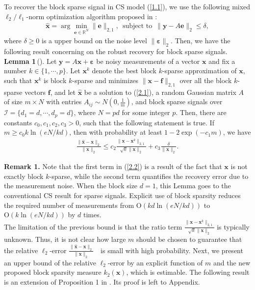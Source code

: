 \documentclass[journal,onecolumn]{IEEEtran}
\begin{document}
To recover the block sparse signal in CS model (\ref{1.1}), we use the following mixed $\ell_2/\ell_1$-norm optimization algorithm proposed in \cite{ekb,em}: \begin{align}
\widehat{\mathbf{x}}=\arg\min_{\mathbf{e}\in\mathbb{R}^N}\lVert\mathbf{e}\rVert_{2,1},\,\,\,\text{subject to}\,\,\,\lVert\mathbf{y}-A\mathbf{e}\rVert_2\leq\delta,
\label{2.1}
\end{align}
where $\delta\geq 0$ is a upper bound on the noise level $\lVert\boldsymbol{\varepsilon}\rVert_2$. Then, we have the following result concerning on the robust recovery for block sparse signals.\\

\noindent
{\bf Lemma 1}\,(\cite{em}). Let $\mathbf{y}=A\mathbf{x}+\boldsymbol{\varepsilon}$ be noisy measurements of a vector $\mathbf{x}$ and fix a number $k\in\{1,\cdots,p\}$. Let $\mathbf{x}^k$ denote the best block $k$-sparse approximation of $\mathbf{x}$, such that $\mathbf{x}^k$ is block $k$-sparse and minimizes $\lVert\mathbf{x}-\mathbf{f}\rVert_{2,1}$ over all the block $k$-sparse vectors $\mathbf{f}$, and let $\widehat{\mathbf{x}}$ be a solution to (\ref{2.1}), a random Gaussian matrix $A$ of size $m\times N$ with entries $A_{ij}\sim N(0,\frac{1}{m})$, and block sparse signals over $\mathcal{I}=\{d_1=d,\cdots,d_p=d\}$, where $N=pd$ for some integer $p$. Then, there are constants $c_0,c_1,c_2,c_3>0$, such that the following statement is true. If $m\geq c_0 k\ln(eN/kd)$, then with probability at least $1-2\exp(-c_1 m)$,  we have\begin{align}
\frac{\lVert\widehat{\mathbf{x}}-\mathbf{x}\rVert_2}{\lVert\mathbf{x}\rVert_2}\leq c_2\frac{\lVert\mathbf{x}-\mathbf{x}^k\rVert_{2,1}}{\sqrt{k}\lVert\mathbf{x}\rVert_2}+c_3\frac{\delta}{\lVert\mathbf{x}\rVert_2}.\label{2.2}
\end{align}

\noindent
{\bf Remark 1.} Note that the first term in (\ref{2.2}) is a result of the fact that $\mathbf{x}$ is not exactly block $k$-sparse, while the second term quantifies the recovery error due to the measurement noise. When the block size $d=1$, this Lemma goes to the conventional CS result for sparse signals. Explicit use of block sparsity reduces the required number of measurements from $\mathrm{O}(kd\ln(eN/kd))$ to $\mathrm{O}(k\ln(eN/kd))$ by $d$ times.\\

The limitation of the previous bound is that the ratio term $\frac{\lVert\mathbf{x}-\mathbf{x}^k\rVert_{2,1}}{\sqrt{k}\lVert\mathbf{x}\rVert_2}$ is typically unknown. Thus, it is not clear how large $m$ should be chosen to guarantee that the relative $\ell_2$-error $\frac{\lVert\widehat{\mathbf{x}}-\mathbf{x}\rVert_2}{\lVert\mathbf{x}\rVert_2}$　is small with high probability. Next, we present an upper bound of the relative $\ell_2$-error by an explicit function of $m$ and the new proposed block sparsity measure $k_2(\mathbf{x})$, which is estimable. The following result is an extension of Proposition 1 in \cite{l2}. Its proof is left to Appendix.\\
\end{document}
